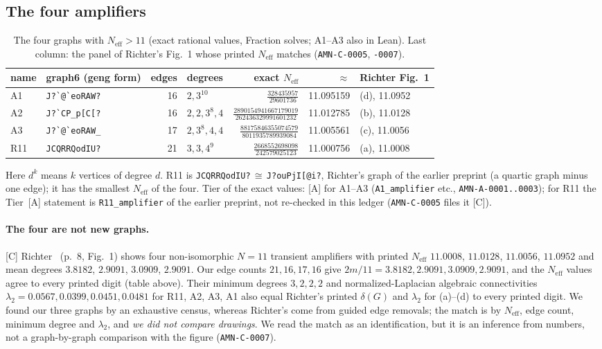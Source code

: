 \documentclass[10pt]{article}
\newcommand{\tier}[1]{\textsf{[#1]}}
\newcommand{\tA}{\tier{A}}
\newcommand{\tC}{\tier{C}}
\newcommand{\lean}[1]{\texttt{#1}}
\newcommand{\Neff}{N_{\mathrm{eff}}}
\begin{document}
\subsection{The four amplifiers}
\begin{table}[h]\centering\small
\caption{The four graphs with $\Neff>11$ (exact rational values, Fraction solves; A1--A3 also in Lean). Last column: the panel of Richter's Fig.~1 whose printed $\Neff$ matches (\texttt{AMN-C-0005}, \texttt{-0007}).}
\begin{tabular}{llrlrrl}\toprule
name & graph6 (geng form) & edges & degrees & exact $\Neff$ & $\approx$ & Richter Fig.~1\\\midrule
A1 & \verb+J?`@`eoRAW?+ & 16 & $2,3^{10}$ & $\tfrac{328435957}{29601736}$ & 11.095159 & (d), 11.0952\\
A2 & \verb+J?`CP_p[C[?+ & 16 & $2,2,3^8,4$ & $\tfrac{2890154941667179019}{262436329991601232}$ & 11.012785 & (b), 11.0128\\
A3 & \verb+J?`@`eoRAW_+ & 17 & $2,3^8,4,4$ & $\tfrac{88175846355074579}{8011935789939084}$ & 11.005561 & (c), 11.0056\\
R11 & \verb+JCQRRQodIU?+ & 21 & $3,3,4^9$ & $\tfrac{2668552698098}{242579025123}$ & 11.000756 & (a), 11.0008\\\bottomrule
\end{tabular}
\end{table}
\noindent Here $d^k$ means $k$ vertices of degree $d$. R11 is \texttt{JCQRRQodIU?}$\,\cong\,$\texttt{J?ouPjI[@i?}, Richter's graph of the earlier preprint (a quartic graph minus one edge); it has the smallest $\Neff$ of the four. Tier of the exact values: \tA{} for A1--A3 (\lean{A1\_amplifier} etc., \texttt{AMN-A-0001..0003}); for R11 the Tier~\tA{} statement is \lean{R11\_amplifier} of the earlier preprint, not re-checked in this ledger (\texttt{AMN-C-0005} files it \tC).

\paragraph{The four are not new graphs.}\tC{} Richter~\cite{rich22} (p.~8, Fig.~1) shows four non-isomorphic $N=11$ transient amplifiers with printed $\Neff$ $11.0008$, $11.0128$, $11.0056$, $11.0952$ and mean degrees $3.8182$, $2.9091$, $3.0909$, $2.9091$. Our edge counts $21,16,17,16$ give $2m/11=3.8182,2.9091,3.0909,2.9091$, and the $\Neff$ values agree to every printed digit (table above). Their minimum degrees $3,2,2,2$ and normalized-Laplacian algebraic connectivities $\lambda_2=0.0567,0.0399,0.0451,0.0481$ for R11, A2, A3, A1 also equal Richter's printed $\delta(G)$ and $\lambda_2$ for (a)--(d) to every printed digit. We found our three graphs by an exhaustive census, whereas Richter's come from guided edge removals; the match is by $\Neff$, edge count, minimum degree and $\lambda_2$, and \emph{we did not compare drawings}. We read the match as an identification, but it is an inference from numbers, not a graph-by-graph comparison with the figure (\texttt{AMN-C-0007}).
\end{document}
